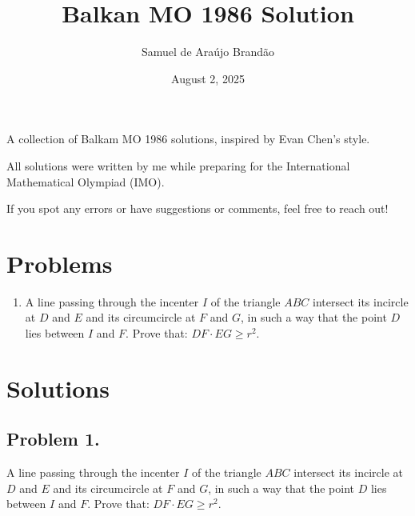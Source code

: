 \documentclass[12pt]{article}
\title{\sffamily\bfseries{Balkan MO 1986 Solution}}
\author{Samuel de Araújo Brandão}
\date{August 2, 2025}
\begin{document}
  \maketitle
  A collection of Balkam MO 1986 solutions, inspired by Evan Chen’s style.

  All solutions were written by me while preparing for the International Mathematical Olympiad (IMO).

  If you spot any errors or have suggestions or comments, feel free to reach out!

  \tableofcontents

  \clearpage

  \section{\textsf{Problems}}
    \begin{enumerate}[label=\textbf{\arabic*.}]
      \item A line passing through the incenter $I$ of the triangle $ABC$ intersect
        its incircle at $D$ and $E$ and its circumcircle at $F$ and $G$, in such
        a way that the point $D$ lies between $I$ and $F$. Prove that:
        $DF \cdot EG \geq r^{2}$.

    \end{enumerate}

  \clearpage

  \section{\textsf{Solutions}}

    \subsection{Problem 1.}
      \begin{tcolorbox}[problembox={Problem statement}]
        A line passing through the incenter $I$ of the triangle $ABC$ intersect
        its incircle at $D$ and $E$ and its circumcircle at $F$ and $G$, in such
        a way that the point $D$ lies between $I$ and $F$. Prove that:
        $DF \cdot EG \geq r^{2}$.
      \end{tcolorbox}
\end{document}
